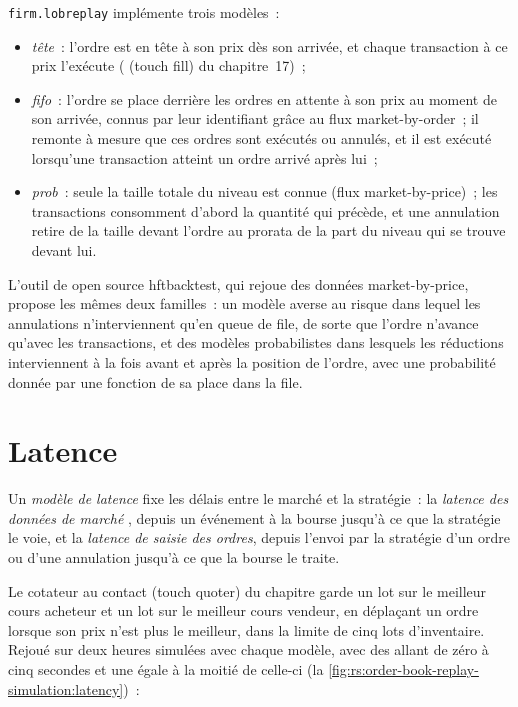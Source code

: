 \texttt{firm.lobreplay} implémente trois modèles~:
\begin{itemize}
\item \emph{tête}~: l'ordre est en tête à son prix dès son arrivée, et chaque transaction à ce prix l'exécute ( (touch fill) du chapitre~17)~;
\item \emph{fifo}~: l'ordre se place derrière les ordres en attente à son prix au moment de son arrivée, connus par leur identifiant grâce au flux market-by-order~; il
remonte à mesure que ces ordres sont exécutés ou annulés, et il est exécuté lorsqu'une transaction atteint un ordre arrivé après lui~;
\item \emph{prob}~: seule la taille totale du niveau est connue (flux market-by-price)~; les transactions consomment d'abord la quantité qui précède, et une annulation
retire de la taille devant l'ordre au prorata de la part du niveau qui se trouve devant lui.
\end{itemize}
L'outil de  open source hftbacktest, qui rejoue des données market-by-price, propose les mêmes deux familles~: un modèle averse au risque dans lequel les annulations
n'interviennent qu'en queue de file, de sorte que l'ordre n'avance qu'avec les transactions, et des modèles probabilistes dans lesquels les réductions interviennent à la fois avant et après
la position de l'ordre, avec une probabilité donnée par une fonction de sa place dans la file.

\section{Latence}

\begin{definition}\label{def:rs:order-book-replay-simulation:latency}
Un \emph{modèle de latence} fixe les délais entre le marché et la stratégie~: la \emph{latence des données de marché}%
, depuis un événement à la bourse jusqu'à ce que la stratégie le voie, et la \emph{latence de saisie des ordres}, depuis
l'envoi par la stratégie d'un ordre ou d'une annulation jusqu'à ce que la bourse le traite.
\end{definition}

Le cotateur au contact (touch quoter) du chapitre garde un lot sur le meilleur cours acheteur et un lot sur le meilleur cours vendeur, en déplaçant un ordre lorsque son prix n'est plus le meilleur, dans la limite de cinq lots
d'inventaire. Rejoué sur deux heures simulées avec chaque modèle, avec des  allant de zéro à cinq secondes et une  égale à la
moitié de celle-ci (la \cref{fig:rs:order-book-replay-simulation:latency})~:

